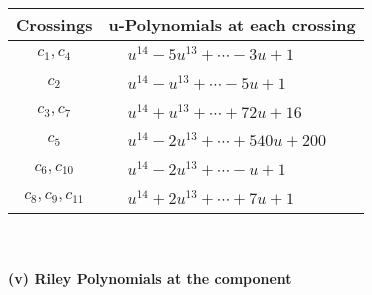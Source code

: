 \documentclass[1p]{elsarticle_modified}
\theoremstyle{definition}
\begin{document}
\begin{tabular}{m{50pt}|m{274pt}}
Crossings & \hspace{64pt}u-Polynomials at each crossing \\
\hline $$\begin{aligned}c_{1},c_{4}\end{aligned}$$&$\begin{aligned}
&u^{14}-5 u^{13}+\cdots-3 u+1
\end{aligned}$\\
\hline $$\begin{aligned}c_{2}\end{aligned}$$&$\begin{aligned}
&u^{14}- u^{13}+\cdots-5 u+1
\end{aligned}$\\
\hline $$\begin{aligned}c_{3},c_{7}\end{aligned}$$&$\begin{aligned}
&u^{14}+u^{13}+\cdots+72 u+16
\end{aligned}$\\
\hline $$\begin{aligned}c_{5}\end{aligned}$$&$\begin{aligned}
&u^{14}-2 u^{13}+\cdots+540 u+200
\end{aligned}$\\
\hline $$\begin{aligned}c_{6},c_{10}\end{aligned}$$&$\begin{aligned}
&u^{14}-2 u^{13}+\cdots- u+1
\end{aligned}$\\
\hline $$\begin{aligned}c_{8},c_{9},c_{11}\end{aligned}$$&$\begin{aligned}
&u^{14}+2 u^{13}+\cdots+7 u+1
\end{aligned}$\\
\hline
\end{tabular}\\~\\
\newpage\renewcommand{\arraystretch}{1}
\flushleft \textbf{(v) Riley Polynomials at the component}\newline \\
\end{document}
